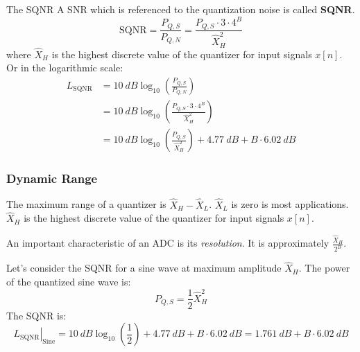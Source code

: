 \begin{refsection}
\begin{definition}{The \acf{SQNR}}
	A \ac{SNR} which is referenced to the quantization noise is called  \textbf{\acf{SQNR}}.
	\begin{equation}
		\mathrm{SQNR} = \frac{P_{Q,S}}{P_{Q,N}} = \frac{P_{Q,S} \cdot 3 \cdot 4^B}{\hat{X}_H^2}
	\end{equation}
	where $\hat{X}_H$ is the highest discrete value of the quantizer for input signals $x[n]$.
	Or in the logarithmic scale:
	\begin{equation}
		\begin{split}
			L_{\mathrm{SQNR}} &= \SI{10}{dB} \log_{10}\left(\frac{P_{Q,S}}{P_{Q,N}}\right) \\
			 &= \SI{10}{dB} \log_{10}\left(\frac{P_{Q,S} \cdot 3 \cdot 4^B}{\hat{X}_H^2}\right) \\
			 &= \SI{10}{dB} \log_{10}\left(\frac{P_{Q,S}}{\hat{X}_H^2}\right) + \SI{4.77}{dB} + B \cdot \SI{6.02}{dB}
		\end{split}
	\end{equation}
\end{definition}


\subsubsection{Dynamic Range}

The maximum range of a quantizer is $\hat{X}_H - \hat{X}_L$. $\hat{X}_L$ is zero is most applications. $\hat{X}_H$ is the highest discrete value of the quantizer for input signals $x[n]$.

An important characteristic of an \ac{ADC} is its \emph{resolution}. It is approximately $\frac{\hat{X}_H}{2^B}$.

Let's consider the \ac{SQNR} for a sine wave at maximum amplitude $\hat{X}_H$. The power of the quantized sine wave is:
\begin{equation}
	P_{Q,S} = \frac{1}{2} \hat{X}_H^2
\end{equation}
The \ac{SQNR} is:
\begin{equation}
	\left.L_{\mathrm{SQNR}}\right|_{\text{Sine}} = \SI{10}{dB} \log_{10}\left(\frac{1}{2}\right) + \SI{4.77}{dB} + B \cdot \SI{6.02}{dB} = \SI{1.761}{dB} + B \cdot \SI{6.02}{dB}
\end{equation}


\end{refsection}
